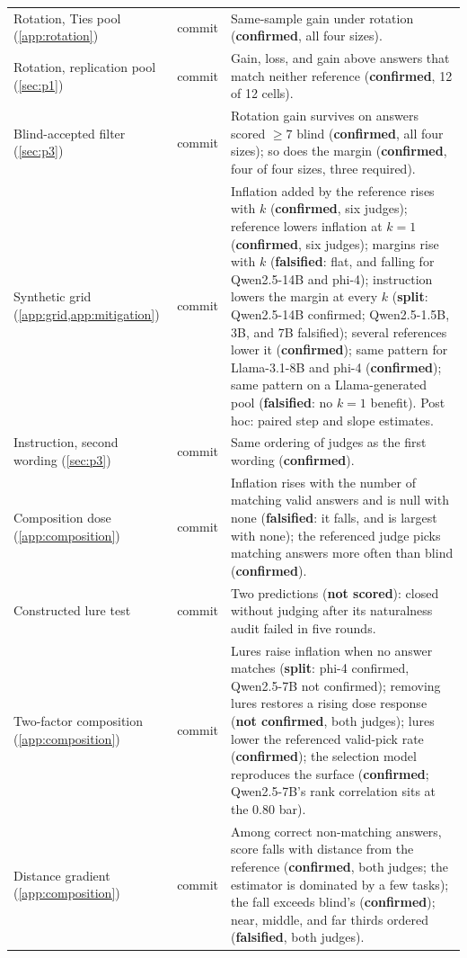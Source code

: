 {\begin{longtable}{L{3.2cm}L{1.1cm}L{8.7cm}}
Rotation, Ties pool (\cref{app:rotation}) & commit & Same-sample gain under rotation (\textbf{confirmed}, all four sizes). \\
Rotation, replication pool (\cref{sec:p1}) & commit & Gain, loss, and gain above answers that match neither reference (\textbf{confirmed}, 12 of 12 cells). \\
Blind-accepted filter (\cref{sec:p3}) & commit & Rotation gain survives on answers scored $\geq 7$ blind (\textbf{confirmed}, all four sizes); so does the margin (\textbf{confirmed}, four of four sizes, three required). \\
Synthetic grid (\cref{app:grid,app:mitigation}) & commit & Inflation added by the reference rises with $k$ (\textbf{confirmed}, six judges); reference lowers inflation at $k{=}1$ (\textbf{confirmed}, six judges); margins rise with $k$ (\textbf{falsified}: flat, and falling for Qwen2.5-14B and phi-4); instruction lowers the margin at every $k$ (\textbf{split}: Qwen2.5-14B confirmed; Qwen2.5-1.5B, 3B, and 7B falsified); several references lower it (\textbf{confirmed}); same pattern for Llama-3.1-8B and phi-4 (\textbf{confirmed}); same pattern on a Llama-generated pool (\textbf{falsified}: no $k{=}1$ benefit). Post hoc: paired step and slope estimates. \\
Instruction, second wording (\cref{sec:p3}) & commit & Same ordering of judges as the first wording (\textbf{confirmed}). \\
Composition dose (\cref{app:composition}) & commit & Inflation rises with the number of matching valid answers and is null with none (\textbf{falsified}: it falls, and is largest with none); the referenced judge picks matching answers more often than blind (\textbf{confirmed}). \\
Constructed lure test & commit & Two predictions (\textbf{not scored}): closed without judging after its naturalness audit failed in five rounds. \\
Two-factor composition (\cref{app:composition}) & commit & Lures raise inflation when no answer matches (\textbf{split}: phi-4 confirmed, Qwen2.5-7B not confirmed); removing lures restores a rising dose response (\textbf{not confirmed}, both judges); lures lower the referenced valid-pick rate (\textbf{confirmed}); the selection model reproduces the surface (\textbf{confirmed}; Qwen2.5-7B's rank correlation sits at the 0.80 bar). \\
Distance gradient (\cref{app:composition}) & commit & Among correct non-matching answers, score falls with distance from the reference (\textbf{confirmed}, both judges; the estimator is dominated by a few tasks); the fall exceeds blind's (\textbf{confirmed}); near, middle, and far thirds ordered (\textbf{falsified}, both judges). \\

\end{longtable}}
